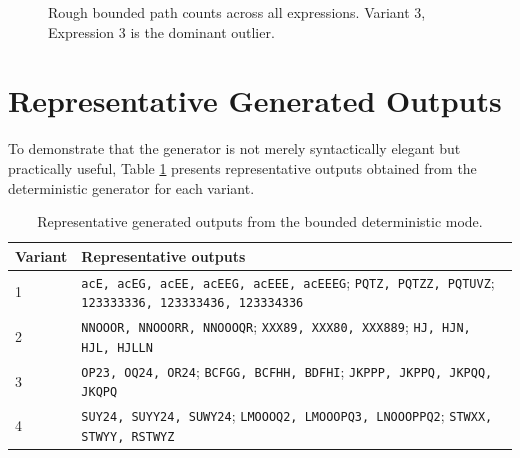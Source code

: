 \documentclass[a4paper,12pt]{article}
\begin{document}
\begin{figure}[H]
    \centering
    \caption{Rough bounded path counts across all expressions. Variant 3, Expression 3 is the dominant outlier.}
\end{figure}

\section{Representative Generated Outputs}

To demonstrate that the generator is not merely syntactically elegant but practically useful, Table \ref{tab:samples} presents representative outputs obtained from the deterministic generator for each variant.

\begin{table}[H]
    \centering
    \caption{Representative generated outputs from the bounded deterministic mode.}
    \label{tab:samples}
    \begin{tabularx}{\textwidth}{lX}
        \toprule
        \textbf{Variant} & \textbf{Representative outputs} \\
        \midrule
        1 & \texttt{acE, acEG, acEE, acEEG, acEEE, acEEEG}; \texttt{PQTZ, PQTZZ, PQTUVZ}; \texttt{123333336, 123333436, 123334336} \\
        2 & \texttt{NNOOOR, NNOOORR, NNOOOQR}; \texttt{XXX89, XXX80, XXX889}; \texttt{HJ, HJN, HJL, HJLLN} \\
        3 & \texttt{OP23, OQ24, OR24}; \texttt{BCFGG, BCFHH, BDFHI}; \texttt{JKPPP, JKPPQ, JKPQQ, JKQPQ} \\
        4 & \texttt{SUY24, SUYY24, SUWY24}; \texttt{LMOOOQ2, LMOOOPQ3, LNOOOPPQ2}; \texttt{STWXX, STWYY, RSTWYZ} \\
        \bottomrule
    \end{tabularx}
\end{table}
\end{document}
